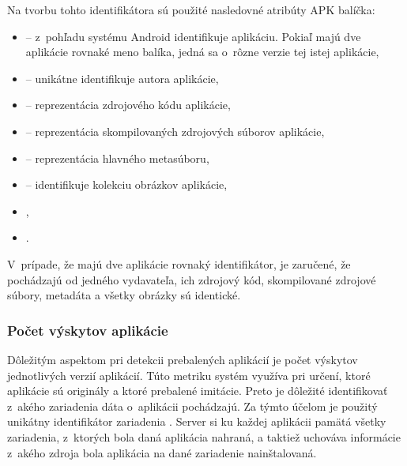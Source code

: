 \noindent Na tvorbu tohto identifikátora sú použité nasledovné atribúty APK balíčka: 
\begin{itemize}
	\item {} -- z~pohľadu systému Android identifikuje aplikáciu. Pokiaľ majú dve aplikácie rovnaké meno balíka, jedná sa o~rôzne verzie tej istej aplikácie,
	\item {} -- unikátne identifikuje autora aplikácie,
	\item {} -- reprezentácia zdrojového kódu aplikácie,
	\item {} -- reprezentácia skompilovaných zdrojových súborov aplikácie,
	\item {} -- reprezentácia hlavného metasúboru,
	\item {} -- identifikuje kolekciu obrázkov aplikácie,
	\item {},
	\item {}.
\end{itemize}
V~prípade, že majú dve aplikácie rovnaký identifikátor, je zaručené, že pochádzajú od jedného vydavateľa, ich zdrojový kód, skompilované zdrojové súbory, metadáta a všetky  obrázky sú identické. 

\subsubsection{\textbf{Počet výskytov aplikácie}}
Dôležitým aspektom pri detekcii prebalených aplikácií je počet výskytov jednotlivých verzií aplikácií. Túto metriku systém využíva pri určení, ktoré aplikácie sú originály a ktoré prebalené imitácie. Preto je dôležité identifikovať z~akého zariadenia dáta o~aplikácii pochádzajú. Za týmto účelom je použitý unikátny identifikátor zariadenia . Server si ku každej aplikácii pamätá všetky zariadenia, z~ktorých bola daná aplikácia nahraná, a taktiež uchováva informácie z~akého zdroja bola aplikácia na dané zariadenie nainštalovaná.


